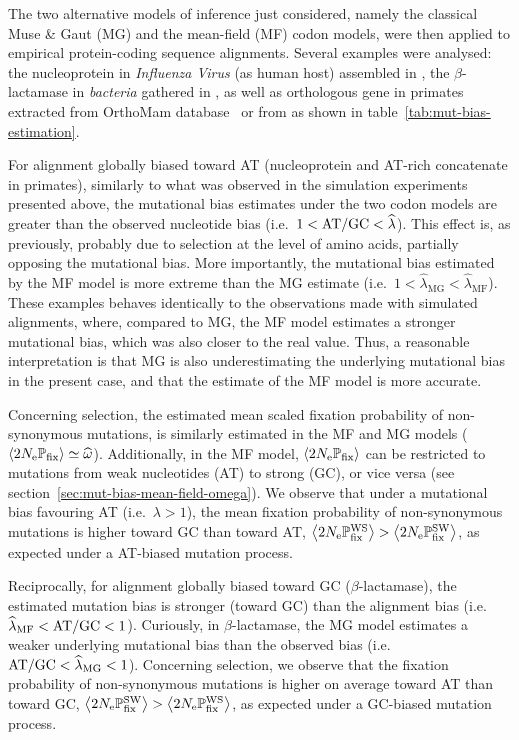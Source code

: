 \documentclass{article}
\begin{document}
The two alternative models of inference just considered, namely the classical Muse \& Gaut ({MG}) and the mean-field ({MF}) codon models, were then applied to empirical protein-coding sequence alignments.
Several examples were analysed: the nucleoprotein in \textit{Influenza Virus} (as human host) assembled in \citet{Bloom2017}, the $\beta$-lactamase in \textit{bacteria} gathered in \citet{Bloom2014}, as well as orthologous gene in primates extracted from OrthoMam database~\citep{Scornavacca2019} or from \citet{Perelman2011} as shown in table~\ref{tab:mut-bias-estimation}.

For alignment globally biased toward AT (nucleoprotein and AT-rich concatenate in primates), similarly to what was observed in the simulation experiments presented above, the mutational bias estimates under the two codon models are greater than the observed nucleotide bias (i.e.~$1 < \text{AT/GC} < \widehat{\lambda}$).
This effect is, as previously, probably due to selection at the level of amino acids, partially opposing the mutational bias.
More importantly, the mutational bias estimated by the {MF} model is more extreme than the {MG} estimate (i.e.~$1 < \widehat{\lambda}_{\text{{MG}}} < \widehat{\lambda}_{\text{{MF}}}$).
These examples behaves identically to the observations made with simulated alignments, where, compared to {MG}, the {MF} model estimates a stronger mutational bias, which was also closer to the real value.
Thus, a reasonable interpretation is that {MG} is also underestimating the underlying mutational bias in the present case, and that the estimate of the {MF} model is more accurate.

Concerning selection, the estimated mean scaled fixation probability of {non-synonymous} mutations, is similarly estimated in the {MF} and {MG} models ($\left\langle 2 N_{\text{e}} \mathbb{P}_{\text{fix}} \right\rangle \simeq \widehat{\omega}$).
Additionally, in the {MF} model, $\left\langle 2 N_{\text{e}} \mathbb{P}_{\text{fix}} \right\rangle$ can be restricted to mutations from weak nucleotides (AT) to strong (GC), or vice versa (see section~\ref{sec:mut-bias-mean-field-omega}).
We observe that under a mutational bias favouring AT (i.e.~$\lambda > 1$), the mean fixation probability of {non-synonymous} mutations is higher toward GC than toward AT, $\left\langle 2 N_{\text{e}} \mathbb{P}_{\text{fix}}^{\text{WS}} \right\rangle > \left\langle 2 N_{\text{e}} \mathbb{P}_{\text{fix}}^{\text{SW}} \right\rangle$, as expected under a AT-biased mutation process.

Reciprocally, for alignment globally biased toward GC ($\beta$-lactamase), the estimated mutation bias is stronger (toward GC) than the alignment bias (i.e.~$\widehat{\lambda}_{\text{{MF}}} < \text{AT/GC} < 1$).
Curiously, in $\beta$-lactamase, the {MG} model estimates a weaker underlying mutational bias than the observed bias (i.e.~$ \text{AT/GC} < \widehat{\lambda}_{\text{{MG}}} < 1$).
Concerning selection, we observe that the fixation probability of {non-synonymous} mutations is higher on average toward AT than toward GC, $\left\langle 2 N_{\text{e}} \mathbb{P}_{\text{fix}}^{\text{SW}} \right\rangle > \left\langle 2 N_{\text{e}} \mathbb{P}_{\text{fix}}^{\text{WS}} \right\rangle$, as expected under a GC-biased mutation process.
\end{document}
